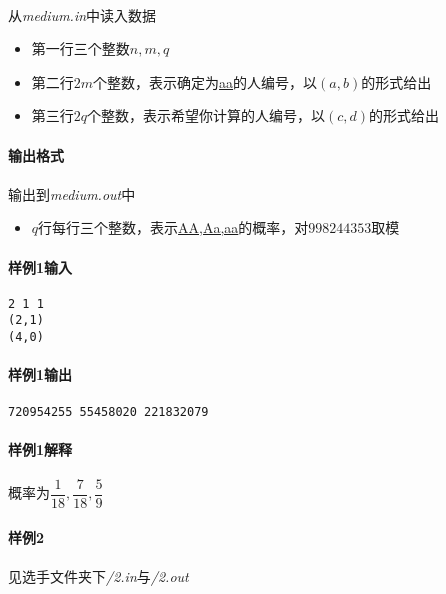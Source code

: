 \documentclass[UTF8]{ctexart}
\begin{document}
\paragraph{}从\emph{medium.in}中读入数据
\begin{itemize}
	\item 第一行三个整数$n,m,q$
	\item 第二行$2m$个整数，表示确定为\underline{aa}的人编号，以$(a,b)$的形式给出
	\item 第三行$2q$个整数，表示希望你计算的人编号，以$(c,d)$的形式给出
\end{itemize}
\paragraph{输出格式}
\paragraph{}输出到\emph{medium.out}中
\begin{itemize}
	\item $q$行每行三个整数，表示\underline{AA,Aa,aa}的概率，对$998244353$取模
\end{itemize}
\paragraph{样例1输入}
\begin{lstlisting}
2 1 1
(2,1)
(4,0)
\end{lstlisting}
\paragraph{样例1输出}
\begin{lstlisting}
720954255 55458020 221832079
\end{lstlisting}
\paragraph{样例1解释}
\paragraph{}概率为$\dfrac{1}{18},\dfrac{7}{18},\dfrac{5}{9}$
\clearpage
\paragraph{样例2}
\paragraph{}见选手文件夹下\emph{/2.in}与\emph{/2.out}
\end{document}
